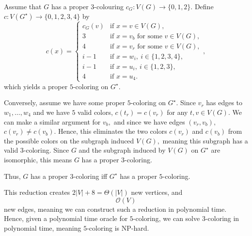 \documentclass[12pt]{article}
\begin{document}
\begin{enumerate}
\begin{center}
    \end{center}
    Assume that $G$ has a proper $3$-colouring $c_G\colon V(G)\to\{0,1,2\}$.
    Define $c\colon V(G^\star)\to\{0,1,2,3,4\}$ by
    \[
      c(x) =
      \begin{cases}
        c_G(v) & \text{if } x = v \in V(G),\\[2pt]
        3      & \text{if } x = v_b \text{ for some } v \in V(G),\\[2pt]
        4      & \text{if } x = v_r \text{ for some } v \in V(G),\\[2pt]
        i-1    & \text{if } x = w_i,\ i\in\{1,2,3,4\},\\[2pt]
        i-1    & \text{if } x = u_i,\ i\in\{1,2,3\},\\[2pt]
        4      & \text{if } x = u_4.
      \end{cases},
    \]
    which yields a proper $5$-coloring on $G^\star.$

    Conversely, assume we have some proper $5$-coloring on $G^\star.$
    Since $v_r$ has edges to $w_1, \ldots, w_4$ and we have $5$ valid
    colors, $c(t_r)= c(v_r)$ for any $t, v \in V(G).$ We can make a
    similar argument for $v_b,$ and since we have edges $(v_r,v_b),$
    $c(v_r) \neq c(v_b).$ Hence, this eliminates the two colors
    $c(v_r)$ and $c(v_b)$ from the possible colors on the subgraph
    induced $V(G),$ meaning this subgraph has a valid $3$-coloring.
    Since $G$ and the subgraph induced by $V(G)$ on $G^\star$ are
    isomorphic, this means $G$ has a proper $3$-coloring.

    Thus, $G$ has a proper $3$-coloring iff $G^\star$ has a proper $5$-coloring.

    This reduction creates $2|V| + 8 = \Theta(|V|)$ new vertices, and
    $$\mathcal O(V)$$ new edges, meaning we can construct such a
    reduction in polynomial time. Hence, given a polynomial time
    oracle for $5$-coloring, we can solve $3$-coloring in polynomial
    time, meaning $5$-coloring is NP-hard.


\end{enumerate}
\end{document}
